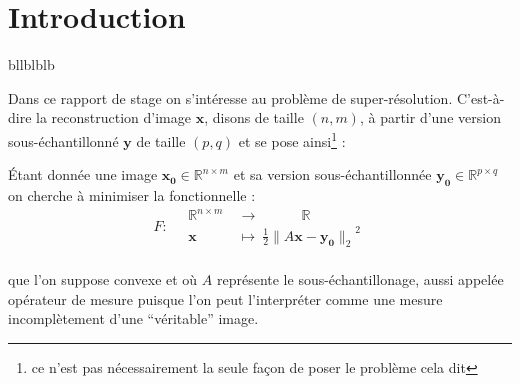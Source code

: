\documentclass[hidelinks, french]{article} %
\newcommand{\R}{\mathbb{R}}
\newcommand{\lr}{\longrightarrow}
\renewcommand{\bf}[1]{\boldsymbol{#1}}
\theoremstyle{enonce}
\theoremstyle{special}
\theoremstyle{rq}
\theoremstyle{exo}
\theoremstyle{demo}
\begin{document}





{}
\section*{Introduction}
{\color{white}bllblblb}

Dans ce rapport de stage on s'intéresse au problème de super-résolution. C'est-à-dire la reconstruction d'image $\bf{x}$, disons de taille $(n,m)$, à partir d'une version sous-échantillonné $\bf{y}$ de taille $(p,q)$ et se pose ainsi\footnote{ce n'est pas nécessairement la seule façon de poser le problème cela dit} : 

Étant donnée une image $\bf{x_0}\in\R^{n\times m}$ et sa version sous-échantillonnée $\bf{y_0}\in\R^{p\times q}$ on cherche à minimiser la fonctionnelle :\begin{equation}\label{eq:F}
F :\quad \begin{aligned}\R^{n\times m}\ &\lr\qquad\quad \R \\ \bf{x}\quad\ &\longmapsto\ \frac{1}{2}{\big\|A\bf{x}-\bf{y_0}\big\|_2}^2\end{aligned}\end{equation}
\\
que l'on suppose convexe et où $A$ représente le sous-échantillonage, aussi appelée opérateur de mesure puisque l'on peut l'interpréter comme une mesure incomplètement d'une ``véritable'' image. 
\\
\end{document}
